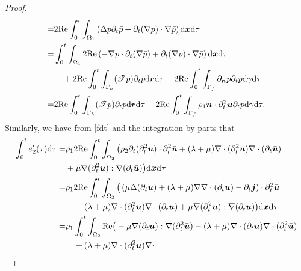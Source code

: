 \documentclass[final,leqno]{siamltex}
\begin{document}
\begin{proof}
\begin{align}
=& 2 {\rm Re} \int_0^t \int_{\Omega_1} \left ( \Delta p  \partial_t \bar p +
\partial_t  (\nabla p )\cdot  \nabla \bar p \right) {\rm d} \boldsymbol x  {\rm
d}\tau \nonumber\\
=& \int_0^{t} \int_{\Omega_1 } 2 {\rm Re} \left (- \nabla p \cdot \partial_t
(\nabla \bar {p}) + \partial_t (\nabla p) \cdot \nabla \bar p \right) {\rm d}
\boldsymbol  x {\rm d} \tau \nonumber \\
&\quad+ 2 {\rm Re}\int_0^t \int_{\Gamma_h} (\mathscr T p)  \partial_t \bar p
{\rm d} \boldsymbol r {\rm d} \tau
- 2 {\rm Re} \int_0^t \int_{\Gamma_f} \partial_{\boldsymbol n} p
\partial_t \bar p  {\rm d}\gamma {\rm d} \tau\nonumber\\
=&   2 {\rm Re}\int_0^t \int_{\Gamma_h} (\mathscr T p)  \partial_t \bar p {\rm
d} \boldsymbol r{\rm d} \tau + 2 {\rm Re} \int_0^t \int_{\Gamma_f}
\rho_1 \boldsymbol n\cdot \partial_t^2 \boldsymbol u \partial_t  \bar p
 {\rm d} \gamma {\rm d}\tau. \label{e11}
\end{align}
Similarly, we have from \eqref{fdt} and the integration by parts that
\begin{align}
 \int_0^{t} e'_{2} (\tau ) {\rm d} \tau
 =&  \rho_1 2 {\rm Re} \int_0^t \int_{\Omega_2} \big(
  \rho_2 \partial_t (\partial_t^2 \boldsymbol u ) \cdot  \partial_t^2 \bar
{\boldsymbol u}
 + (\lambda +\mu) \nabla \cdot (\partial_t^2 \boldsymbol u) \nabla \cdot
(\partial_t  \bar {\boldsymbol u})\notag\\
&+ \mu  \nabla (\partial_t^2 \boldsymbol u) :\nabla (\partial_t \bar
{\boldsymbol u}) \big){\rm d} \boldsymbol x {\rm d} \tau \nonumber\\
 =& {\rho_1} 2 {\rm Re} \int_0^ t\int_{\Omega_2} \big(
 \left( \mu \Delta  (\partial_t \boldsymbol u) + (\lambda +\mu ) \nabla \nabla
\cdot (\partial_t \boldsymbol u)
 -\partial_t \boldsymbol j \right)  \cdot  \partial_t^2 \bar {\boldsymbol u}
\nonumber\\
 &\quad+(\lambda +\mu) \nabla \cdot (\partial_t^2 \boldsymbol u) \nabla \cdot
(\partial_t  \bar {\boldsymbol u}) + \mu  \nabla (\partial_t^2 \boldsymbol u) :
\nabla (\partial_t \bar {\boldsymbol u})
 \big){\rm d}\boldsymbol x {\rm d} \tau \nonumber \\
 =& \rho_1 \int_0^t \int_{\Omega_2 }{\rm Re} \big( - \mu  \nabla (\partial_t
\boldsymbol u) : \nabla (\partial_t^2  \bar {\boldsymbol u}) -
 (\lambda+\mu) \nabla \cdot (\partial_t \boldsymbol u) \nabla \cdot
(\partial_t^2  \bar {\boldsymbol u})\nonumber\\
 &\quad+ (\lambda +\mu) \nabla \cdot (\partial_t^2 \boldsymbol u) \nabla \cdot

\end{align}
\end{proof}
\end{document}
